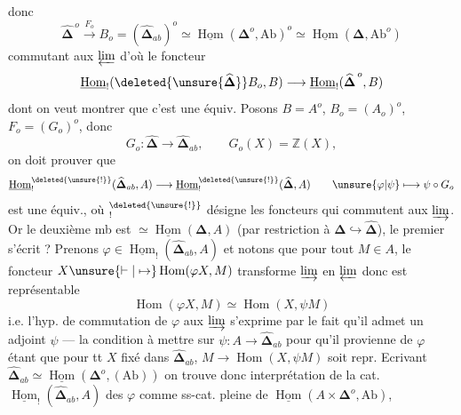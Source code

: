 donc
\[
\widehat{\boldsymbol\Delta}^{\,o}\xrightarrow{F_o}
B_o=(\widehat{\boldsymbol\Delta}_{ab})^o
\simeq\underline{\operatorname{Hom}}(\boldsymbol\Delta^o,\mathrm{Ab})^o
\simeq\underline{\operatorname{Hom}}(\boldsymbol\Delta,\mathrm{Ab}^o)
\]
commutant aux $\varprojlim$
d'où le foncteur
\[
\underline{\operatorname{Hom}}_!(\deleted{\unsure{\widehat{\boldsymbol\Delta}}}B_o,B)
\longrightarrow\underline{\operatorname{Hom}}_!(\widehat{\boldsymbol\Delta}^{\,o},B)
\]
dont on veut montrer que c'est une équiv. Posons
$B=A^o$, $B_o=(A_o)^o$,  $F_o=(G_o)^o$, donc
\[
G_o:\widehat{\boldsymbol\Delta}\longrightarrow\widehat{\boldsymbol\Delta}_{ab},\qquad G_o(X)=\mathbb Z(X),
\]
on doit prouver que
\[
\underline{\operatorname{Hom}}^{\deleted{\unsure{!}}}_!(\widehat{\boldsymbol\Delta}_{ab},A)
\longrightarrow\underline{\operatorname{Hom}}^{\deleted{\unsure{!}}}_!(\widehat{\boldsymbol\Delta},A)
\qquad\unsure{\varphi|\psi}\longmapsto\psi\circ G_o
\]
est une équiv., où ${}^{\deleted{\unsure{!}}}_!$ désigne les foncteurs
qui commutent aux $\varinjlim$. Or
le deuxième mb est $\simeq\underline{\operatorname{Hom}}(\boldsymbol\Delta,A)$
(par restriction à $\boldsymbol\Delta\hookrightarrow\widehat{\boldsymbol\Delta}$),  le
premier s'écrit ?  Prenons $\varphi\in\underline{\operatorname{Hom}}_!(\widehat{\boldsymbol\Delta}_{ab},A)$
et notons que pour tout $M\in A$,  le
foncteur $X\unsure{\vdash|\mapsto}\operatorname{Hom}(\varphi X,M)$ transforme $\varinjlim$
en $\varprojlim$ donc est représentable
\[
\operatorname{Hom}(\varphi X,M)\simeq\operatorname{Hom}(X,\psi M)
\]
i.e. l'hyp. de commutation de $\varphi$ aux $\varinjlim$
s'exprime par le fait qu'il admet un
adjoint $\psi$ --- la condition à mettre sur \deleted{\unsure{\varphi}}
$\psi:A\longrightarrow\widehat{\boldsymbol\Delta}_{ab}$ pour qu'il provienne de $\varphi$
étant que pour tt $X$ fixé dans $\widehat{\boldsymbol\Delta}_{ab}$, $M\longrightarrow\operatorname{Hom}(X,\psi M)$
soit repr. Ecrivant $\widehat{\boldsymbol\Delta}_{ab}\simeq\underline{\operatorname{Hom}}(\boldsymbol\Delta^o,(\mathrm{Ab}))$
on trouve donc interprétation de la
cat. $\underline{\operatorname{Hom}}_!(\widehat{\boldsymbol\Delta}_{ab},A)$ des $\varphi$ comme ss-cat. pleine
de $\underline{\operatorname{Hom}}(A\times\boldsymbol\Delta^o,\mathrm{Ab})$,
